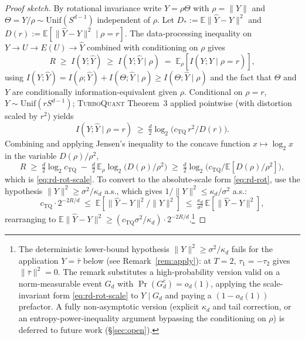 \documentclass{article}
\theoremstyle{remark}
\newcommand{\E}{\mathbb{E}}
\begin{document}
\begin{proof}[Proof sketch]
By rotational invariance write $Y = \rho\Theta$ with $\rho = \|Y\|$ and
$\Theta = Y/\rho \sim \mathrm{Unif}(S^{d-1})$ independent of $\rho$.
Let $D_* := \E\|\hat Y - Y\|^2$ and $D(r) := \E[\|\hat Y - Y\|^2 \mid
\rho = r]$. The data-processing inequality on $Y \to U \to E(U) \to
\hat Y$ combined with conditioning on $\rho$ gives
\begin{equation}\label{eq:dpi}
  R \;\geq\; I(Y; \hat Y) \;\geq\; I(Y; \hat Y \mid \rho)
  \;=\; \E_\rho\!\left[I(Y;\hat Y \mid \rho = r)\right],
\end{equation}
using $I(Y;\hat Y) = I(\rho;\hat Y) + I(\Theta;\hat Y\mid\rho) \geq
I(\Theta;\hat Y\mid\rho)$ and the fact that $\Theta$ and $Y$ are
conditionally information-equivalent given $\rho$. Conditional on
$\rho = r$, $Y \sim \mathrm{Unif}(r S^{d-1})$; \textsc{TurboQuant}
Theorem~3 applied pointwise (with distortion scaled by $r^2$) yields
\[
  I(Y;\hat Y \mid \rho = r) \;\geq\; \tfrac{d}{2}\log_2\!
  \bigl(c_{\mathrm{TQ}}\,r^2 / D(r)\bigr).
\]
Combining and applying Jensen's inequality to the concave function
$x \mapsto \log_2 x$ in the variable $D(\rho)/\rho^2$,
\[
  R \;\geq\; \tfrac{d}{2}\log_2 c_{\mathrm{TQ}}
  \;-\; \tfrac{d}{2}\,\E_\rho\!\log_2\!\bigl(D(\rho)/\rho^2\bigr)
  \;\geq\; \tfrac{d}{2}\log_2\!\bigl(c_{\mathrm{TQ}}/\E[D(\rho)/\rho^2]\bigr),
\]
which is \eqref{eq:rd-rot-scale}. To convert to the absolute-scale
form \eqref{eq:rd-rot}, use the hypothesis $\|Y\|^2 \geq \sigma^2 /
\kappa_d$ a.s., which gives $1/\|Y\|^2 \leq \kappa_d/\sigma^2$ a.s.:
\[
  c_{\mathrm{TQ}}\cdot 2^{-2R/d}
  \;\leq\; \E[\|\hat Y - Y\|^2 / \|Y\|^2]
  \;\leq\; \tfrac{\kappa_d}{\sigma^2}\,\E[\|\hat Y - Y\|^2],
\]
rearranging to $\E\|\hat Y - Y\|^2 \geq (c_{\mathrm{TQ}}\sigma^2 /
\kappa_d) \cdot 2^{-2R/d}$.\footnote{The deterministic lower-bound
hypothesis $\|Y\|^2 \geq \sigma^2/\kappa_d$ fails for the application
$Y = \bar\tau$ below (see Remark~\ref{rem:apply}): at $T=2$,
$\tau_1 = -\tau_2$ gives $\|\bar\tau\|^2 = 0$. The remark substitutes
a high-probability version valid on a norm-measurable event $G_d$
with $\Pr(G_d^c) = o_d(1)$, applying the scale-invariant form
\eqref{eq:rd-rot-scale} to $Y\mid G_d$ and paying a $(1-o_d(1))$
prefactor. A fully non-asymptotic version (explicit
$\kappa_d$ and tail correction, or an entropy-power-inequality
argument bypassing the conditioning on $\rho$) is deferred to
future work (\S\ref{sec:open}).}
\end{proof}
\end{document}
